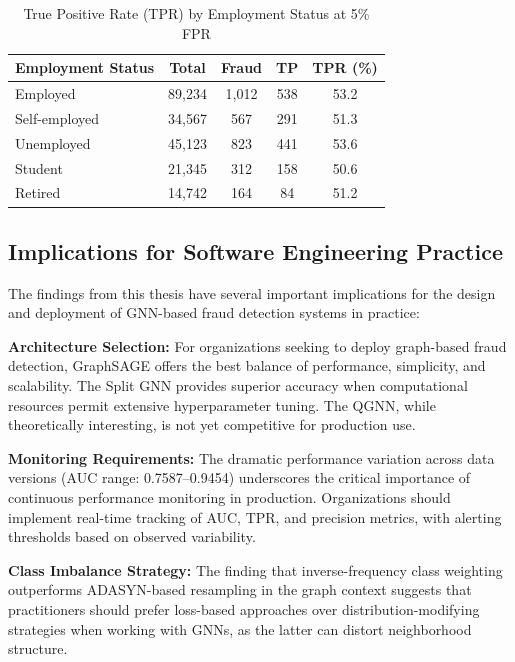 \begin{table}[H]
\centering
\tablestrut
\caption{True Positive Rate (TPR) by Employment Status at 5\% FPR}
\label{tab:gnn-fairness-employment}
\small
\begin{tabularx}{0.85\textwidth}{Xcccc}
\toprule
\textbf{Employment Status} & {\textbf{Total}} & {\textbf{Fraud}} & {\textbf{TP}} & {\textbf{TPR (\%)}} \\
\midrule
Employed      & 89,234 & 1,012 & 538 & 53.2 \\
Self-employed & 34,567 & 567   & 291 & 51.3 \\
Unemployed    & 45,123 & 823   & 441 & 53.6 \\
Student       & 21,345 & 312   & 158 & 50.6 \\
Retired       & 14,742 & 164   & 84  & 51.2 \\
\bottomrule
\end{tabularx}
\end{table}


\subsection{Implications for Software Engineering Practice}

The findings from this thesis have several important implications for the design and deployment of GNN-based fraud detection systems in practice:

\textbf{Architecture Selection:} For organizations seeking to deploy graph-based fraud detection, GraphSAGE offers the best balance of performance, simplicity, and scalability. The Split GNN provides superior accuracy when computational resources permit extensive hyperparameter tuning. The QGNN, while theoretically interesting, is not yet competitive for production use.

\textbf{Monitoring Requirements:} The dramatic performance variation across data versions (AUC range: 0.7587--0.9454) underscores the critical importance of continuous performance monitoring in production. Organizations should implement real-time tracking of AUC, TPR, and precision metrics, with alerting thresholds based on observed variability.

\textbf{Class Imbalance Strategy:} The finding that inverse-frequency class weighting outperforms ADASYN-based resampling in the graph context suggests that practitioners should prefer loss-based approaches over distribution-modifying strategies when working with GNNs, as the latter can distort neighborhood structure.

